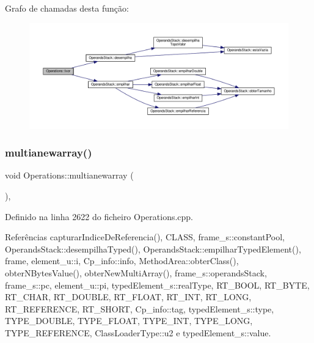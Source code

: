 Grafo de chamadas desta função\+:\nopagebreak
\begin{figure}[H]
\begin{center}
\leavevmode
\includegraphics[width=350pt]{classOperations_ac135e723f1ac6a27c736e6b8e7d06a45_cgraph}
\end{center}
\end{figure}
\mbox{\label{classOperations_a78c45edfcdf63668974ffc3b2d84a309}} 
\subsubsection{\texorpdfstring{multianewarray()}{multianewarray()}}
{\footnotesize\ttfamily void Operations\+::multianewarray (\begin{DoxyParamCaption}{ }\end{DoxyParamCaption})\hspace{0.3cm}{\ttfamily [static]}, {\ttfamily [private]}}



Definido na linha 2622 do ficheiro Operations.\+cpp.



Referências capturar\+Indice\+De\+Referencia(), C\+L\+A\+SS, frame\+\_\+s\+::constant\+Pool, Operands\+Stack\+::desempilha\+Typed(), Operands\+Stack\+::empilhar\+Typed\+Element(), frame, element\+\_\+u\+::i, Cp\+\_\+info\+::info, Method\+Area\+::obter\+Class(), obter\+N\+Bytes\+Value(), obter\+New\+Multi\+Array(), frame\+\_\+s\+::operands\+Stack, frame\+\_\+s\+::pc, element\+\_\+u\+::pi, typed\+Element\+\_\+s\+::real\+Type, R\+T\+\_\+\+B\+O\+OL, R\+T\+\_\+\+B\+Y\+TE, R\+T\+\_\+\+C\+H\+AR, R\+T\+\_\+\+D\+O\+U\+B\+LE, R\+T\+\_\+\+F\+L\+O\+AT, R\+T\+\_\+\+I\+NT, R\+T\+\_\+\+L\+O\+NG, R\+T\+\_\+\+R\+E\+F\+E\+R\+E\+N\+CE, R\+T\+\_\+\+S\+H\+O\+RT, Cp\+\_\+info\+::tag, typed\+Element\+\_\+s\+::type, T\+Y\+P\+E\+\_\+\+D\+O\+U\+B\+LE, T\+Y\+P\+E\+\_\+\+F\+L\+O\+AT, T\+Y\+P\+E\+\_\+\+I\+NT, T\+Y\+P\+E\+\_\+\+L\+O\+NG, T\+Y\+P\+E\+\_\+\+R\+E\+F\+E\+R\+E\+N\+CE, Class\+Loader\+Type\+::u2 e typed\+Element\+\_\+s\+::value.

